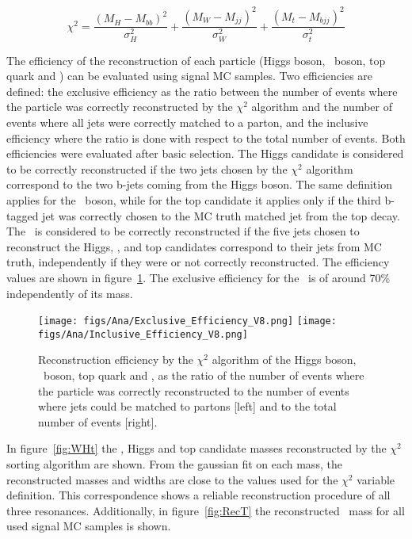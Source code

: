 \begin{equation}
\chi^{2}=\frac{(M_{H}-M_{bb})^{2}}{\sigma_{H}^{2}}+\frac{(M_{W}-M_{jj})^{2}}{\sigma_{W}^{2}}+\frac{(M_{t}-M_{bjj})^{2}}{\sigma_{t}^{2}}
\label{eq:chi2def}
\end{equation}

The efficiency of the reconstruction of each particle (Higgs boson, \W~boson, top quark and \Tp) can be evaluated using signal MC samples. Two efficiencies are defined: the exclusive efficiency as the ratio between the number of events where the particle was correctly reconstructed by the $\chi^{2}$ algorithm and the number of events where all jets were correctly matched to a parton, and the inclusive efficiency where the ratio is done with respect to the total number of events. Both efficiencies were evaluated after basic selection. The Higgs candidate is considered to be correctly reconstructed if the two jets chosen by the $\chi^{2}$ algorithm correspond to the two b-jets coming from the Higgs boson. The same definition applies for the \W~boson, while for the top candidate it applies only if the third b-tagged jet was correctly chosen to the MC truth matched jet from the top decay. The \Tp~is considered to be correctly reconstructed if the five jets chosen to reconstruct the Higgs, \W, and top candidates correspond to their jets from MC truth, independently if they were or not correctly reconstructed. The efficiency values are shown in figure~\ref{fig:RecEff}. The exclusive efficiency for the \Tp~is of around 70\% independently of its mass.

\begin{figure}[!Hhtbp]
  \begin{center}
    \texttt{[image: figs/Ana/Exclusive\_Efficiency\_V8.png]}
    \texttt{[image: figs/Ana/Inclusive\_Efficiency\_V8.png]}
    \caption{Reconstruction efficiency by the $\chi^{2}$ algorithm of the Higgs boson, \W~boson, top quark and \Tp, as the ratio of the number of events where the particle was correctly reconstructed to the number of events where jets could be matched to partons [left] and to the total number of events [right].}
    \label{fig:RecEff}
  \end{center}
\end{figure}

In figure~\ref{fig:WHt} the \W, Higgs and top candidate masses reconstructed by the $\chi^{2}$ sorting algorithm are shown. From the gaussian fit on each mass, the reconstructed masses and widths are close to the values used for the $\chi^{2}$ variable definition. This correspondence shows a reliable reconstruction procedure of all three resonances. Additionally, in figure~\ref{fig:RecT} the reconstructed \Tp~mass for all used signal MC samples is shown.

